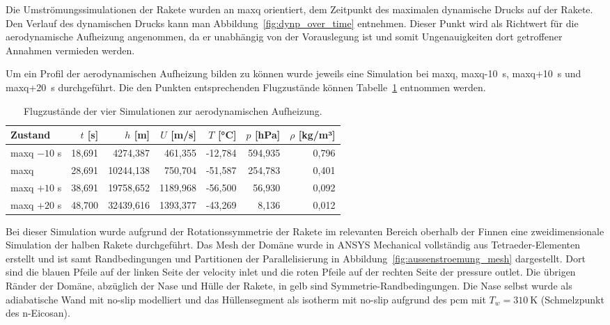 Die Umströmungssimulationen der Rakete wurden an \ac{maxq} orientiert, dem Zeitpunkt des maximalen dynamische Drucks auf der Rakete.
Den Verlauf des dynamischen Drucks kann man Abbildung~\ref{fig:dynp_over_time} entnehmen.
Dieser Punkt wird als Richtwert für die aerodynamische Aufheizung angenommen, da er unabhängig von der Vorauslegung ist und somit Ungenauigkeiten dort getroffener Annahmen vermieden werden.

Um ein Profil der aerodynamischen Aufheizung bilden zu können wurde jeweils eine Simulation bei \ac{maxq}, \ac{maxq}-\SI{10}{\second},
\ac{maxq}+\SI{10}{\second} und \ac{maxq}+\SI{20}{\second} durchgeführt. Die den Punkten entsprechenden Flugzustände können Tabelle~\ref{tab:simulation_flugzustand} entnommen werden.

\begin{table}[H]
  \centering
  \caption{Flugzustände der vier Simulationen zur aerodynamischen Aufheizung.}\label{tab:simulation_flugzustand}

  \begin{tabular}{lrrrrrr}
    \toprule[1pt]
    Zustand & $t$ [s] & $h$ [m] & $U$ [m/s] & $T$ [°C] & $p$ [hPa] & $\rho$ [kg/m³] \\
    \midrule[0.5pt]
    \ac{maxq} $-10$ s    & 18,691 & 4274,387  & 461,355  & -12,784 & 594,935 & 0,796 \\
    \ac{maxq}            & 28,691 & 10244,138 & 750,704  & -51,587 & 254,783 & 0,401 \\
    \ac{maxq} $+10$ s    & 38,691 & 19758,652 & 1189,968 & -56,500 & 56,930  & 0,092 \\
    \ac{maxq} $+20$ s    & 48,700 & 32439,616 & 1393,377 & -43,269 & 8,136   & 0,012 \\
    \bottomrule[1pt]
  \end{tabular}
\end{table}

Bei dieser Simulation wurde aufgrund der Rotationssymmetrie der Rakete im relevanten Bereich oberhalb der Finnen eine zweidimensionale Simulation der halben Rakete durchgeführt.
Das Mesh der Domäne wurde in ANSYS Mechanical vollständig aus Tetraeder-Elementen erstellt und ist samt Randbedingungen und Partitionen der Parallelisierung in Abbildung~\ref{fig:aussenstroemung_mesh} dargestellt.
Dort sind die blauen Pfeile auf der linken Seite der velocity inlet und die roten Pfeile auf der rechten Seite der pressure outlet.
Die übrigen Ränder der Domäne, abzüglich der Nase und Hülle der Rakete, in gelb sind Symmetrie-Randbedingungen.
Die Nase selbst wurde als adiabatische Wand mit no-slip modelliert und das Hüllensegment als isotherm mit no-slip aufgrund des \ac{pcm} mit $T_w = \SI{310}{\kelvin}$ (Schmelzpunkt des n-Eicosan).

